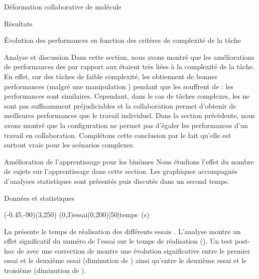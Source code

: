 \documentclass[myfrancais,ngerman,english,french]{mythesis}
\begin{document}
\begin{mychapter}{Déformation collaborative de molécule}
\begin{mysection}{Résultats}
\begin{mysubsection}{Évolution des performances en fonction des critères de complexité de la tâche}
\begin{mysubsubsection}{Analyse et discussion}
					Dans cette section, nous avons montré que les améliorations de performances des  par rapport aux  étaient très liées à la complexité de la tâche.
					En effet, sur des tâches de faible complexité, les  obtiennent de bonnes performances (malgré une manipulation ) pendant que les  souffrent de  : les performances sont similaires.
					Cependant, dans le cas de tâches complexes, les  ne sont pas suffisamment préjudiciables et la collaboration permet d'obtenir de meilleures performances que le travail individuel.
					Dans la section précédente, nous avons montré que la configuration  ne permet pas d'égaler les performances d'un travail en collaboration.
					Complétons cette conclusion par le fait qu'elle est surtout vraie pour les scénarios complexes.
				\end{mysubsubsection}
			\end{mysubsection}
			\begin{mysubsection}{Amélioration de l'apprentissage pour les binômes}
				Nous étudions l'effet du nombre de sujets sur l'apprentissage dans cette section.
				Les graphiques accompagnés d'analyses statistiques sont présentés puis discutés dans un second temps.
				\begin{mysubsubsection}{Données et statistiques}
					\begin{myfigure}
						\begin{myps}(-0.45,-90)(3,250)
							\myaxes(0,3){essai}(0,200)[50]{temps~(s)}
						\end{myps}
					\end{myfigure}

					La  présente le temps de réalisation  des différents essais .
					L'analyse montre un effet significatif du numéro de l'essai  sur le temps de réalisation  ().
					Un test post-hoc de  avec une correction de  montre une évolution significative entre le premier essai et le deuxième essai (diminution de ) ainsi qu'entre le deuxième essai et le troisième (diminution de ).


\end{mysubsubsection}
\end{mysubsection}
\end{mysection}
\end{mychapter}
\end{document}
